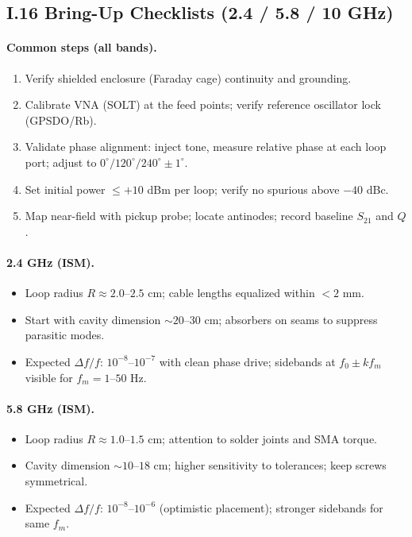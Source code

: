 \subsection*{I.16 Bring-Up Checklists (2.4 / 5.8 / 10 GHz)}
\paragraph{Common steps (all bands).}
\begin{enumerate}
\item Verify shielded enclosure (Faraday cage) continuity and grounding.
\item Calibrate VNA (SOLT) at the feed points; verify reference oscillator lock (GPSDO/Rb).
\item Validate phase alignment: inject tone, measure relative phase at each loop port; adjust to $0^\circ/120^\circ/240^\circ\pm 1^\circ$.
\item Set initial power $\leq +10$ dBm per loop; verify no spurious above \(-40\) dBc.
\item Map near-field with pickup probe; locate antinodes; record baseline $S_{21}$ and $Q$.
\end{enumerate}

\paragraph{2.4 GHz (ISM).}
\begin{itemize}
\item Loop radius $R \approx 2.0$--$2.5$ cm; cable lengths equalized within $< 2$ mm.
\item Start with cavity dimension $\sim 20$--$30$ cm; absorbers on seams to suppress parasitic modes.
\item Expected $\Delta f/f$: $10^{-8}$--$10^{-7}$ with clean phase drive; sidebands at $f_0\pm kf_m$ visible for $f_m=1$--$50$ Hz.
\end{itemize}

\paragraph{5.8 GHz (ISM).}
\begin{itemize}
\item Loop radius $R \approx 1.0$--$1.5$ cm; attention to solder joints and SMA torque.
\item Cavity dimension $\sim 10$--$18$ cm; higher sensitivity to tolerances; keep screws symmetrical.
\item Expected $\Delta f/f$: $10^{-8}$--$10^{-6}$ (optimistic placement); stronger sidebands for same $f_m$.
\end{itemize}

